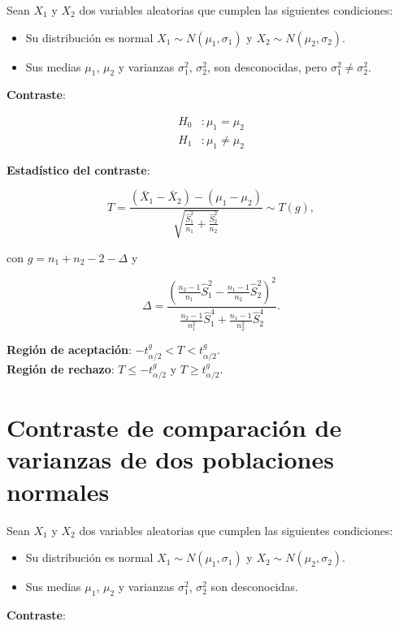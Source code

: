 \documentclass[
  spanish,
  a4paper,
]{scrreport}
\providecommand{\tightlist}{%
  \setlength{\itemsep}{0pt}\setlength{\parskip}{0pt}}
\theoremstyle{plain}
\theoremstyle{definition}
\theoremstyle{definition}
\theoremstyle{remark}
\begin{document}
Sean \(X_1\) y \(X_2\) dos variables aleatorias que cumplen las
siguientes condiciones:

\begin{itemize}
\tightlist
\item
  Su distribución es normal \(X_1\sim N(\mu_1,\sigma_1)\) y
  \(X_2\sim N(\mu_2,\sigma_2)\).
\item
  Sus medias \(\mu_1\), \(\mu_2\) y varianzas \(\sigma_1^2\),
  \(\sigma_2^2\), son desconocidas, pero
  \(\sigma^2_1\not = \sigma^2_2\).
\end{itemize}

\textbf{Contraste}:

\begin{align*}
H_0 &: \mu_1=\mu_2 \\
H_1 &: \mu_1\neq \mu_2
\end{align*}

\textbf{Estadístico del contraste}:

\[
T=\frac{(\bar{X}_1-\bar{X}_2)-(\mu_1-\mu_2)}{\sqrt{\frac{\hat{S}^2_1}{n_1}+\frac{\hat{S}^2_2}{n_2}}} \sim T(g),
\]

con \(g=n_1+n_2-2-\Delta\) y

\[\Delta = \frac{(\frac{n_2-1}{n_1}\hat{S}_1^2-\frac{n_1-1}{n_2}\hat{S}_2^2)^2}{\frac{n_2-1}{n_1^2}\hat{S}_1^4+\frac{n_1-1}{n_2^2}\hat{S}_2^4}.
\]

\textbf{Región de aceptación}:
\(-t_{\alpha/2}^{g} < T < t_{\alpha/2}^{g}\).\\
\textbf{Región de rechazo}: \(T\leq -t_{\alpha/2}^{g}\) y
\(T\geq t_{\alpha/2}^{g}\).

\section{Contraste de comparación de varianzas de dos poblaciones
normales}\label{contraste-de-comparaciuxf3n-de-varianzas-de-dos-poblaciones-normales}

Sean \(X_1\) y \(X_2\) dos variables aleatorias que cumplen las
siguientes condiciones:

\begin{itemize}
\tightlist
\item
  Su distribución es normal \(X_1\sim N(\mu_1,\sigma_1)\) y
  \(X_2\sim N(\mu_2,\sigma_2)\).
\item
  Sus medias \(\mu_1\), \(\mu_2\) y varianzas \(\sigma_1^2\),
  \(\sigma_2^2\) son desconocidas.
\end{itemize}

\textbf{Contraste}:
\end{document}

